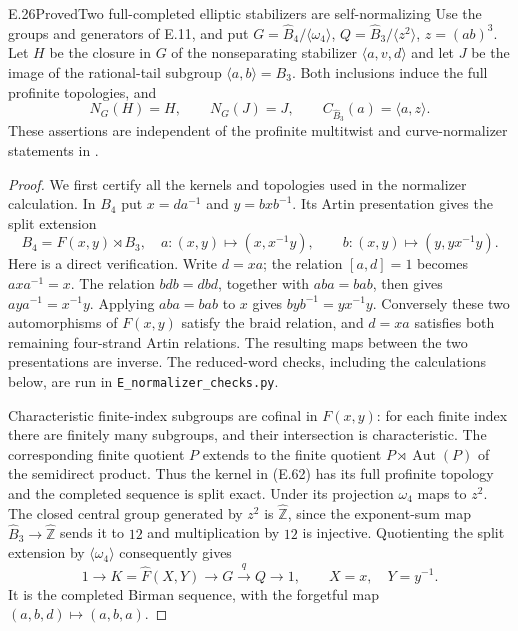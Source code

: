 \begin{result}{E.26}{Proved}{Two full-completed elliptic stabilizers are self-normalizing}
Use the groups and generators of E.11, and put
$G=\widehat B_4/\langle\omega _4\rangle$,
$Q=\widehat B_3/\langle z^2\rangle$,
$z=(ab)^3$.  Let $H$ be the closure in $G$ of the
nonseparating stabilizer $\langle a,v,d\rangle$ and
let $J$ be the image of the rational-tail subgroup
$\langle a,b\rangle=B_3$.  Both inclusions induce
the full profinite topologies, and
\[
 N_G(H)=H,\qquad N_G(J)=J,\qquad
 C_{\widehat B_3}(a)=\langle a,z\rangle.                 \tag{E.61}
\]
These assertions are independent of the profinite
multitwist and curve-normalizer statements in
\cite[\S5]{ET_Boggi2014}.
\end{result}
\begin{proof}
We first certify all the kernels and topologies used
in the normalizer calculation.  In $B_4$ put
$x=da^{-1}$ and $y=bxb^{-1}$.  Its Artin presentation
gives the split extension
\[
 B_4=F(x,y)\rtimes B_3,
 \quad
 a:(x,y)\longmapsto(x,x^{-1}y),\qquad
 b:(x,y)\longmapsto(y,yx^{-1}y).                          \tag{E.62}
\]
Here is a direct verification.  Write $d=xa$; the
relation $[a,d]=1$ becomes $axa^{-1}=x$.
The relation $bdb=dbd$, together with $aba=bab$,
then gives $aya^{-1}=x^{-1}y$.  Applying $aba=bab$
to $x$ gives $byb^{-1}=yx^{-1}y$.  Conversely these
two automorphisms of $F(x,y)$ satisfy the braid
relation, and $d=xa$ satisfies both remaining
four-strand Artin relations.  The resulting maps
between the two presentations are inverse.
The reduced-word checks, including the calculations
below, are run in \texttt{E\_normalizer\_checks.py}.

Characteristic finite-index subgroups are cofinal
in $F(x,y)$: for each finite index there are finitely
many subgroups, and their intersection is
characteristic.  The corresponding finite quotient
$P$ extends to the finite quotient
$P\rtimes\operatorname{Aut}(P)$ of the semidirect
product.  Thus the kernel in (E.62) has its full
profinite topology and the completed sequence is
split exact.  Under its projection $\omega _4$
maps to $z^2$.  The closed central group generated
by $z^2$ is $\widehat{\mathbb Z}$, since the
exponent-sum map $\widehat B_3\to\widehat{\mathbb Z}$
sends it to $12$ and multiplication by $12$ is
injective.  Quotienting the split extension by
$\langle\omega _4\rangle$ consequently gives
\[
 1\longrightarrow K=\widehat F(X,Y)
 \longrightarrow G\overset q\longrightarrow Q
 \longrightarrow1,
 \qquad X=x,\quad Y=y^{-1}.                              \tag{E.63}
\]
It is the completed Birman sequence, with the
forgetful map $(a,b,d)\mapsto(a,b,a)$.


\end{proof}
